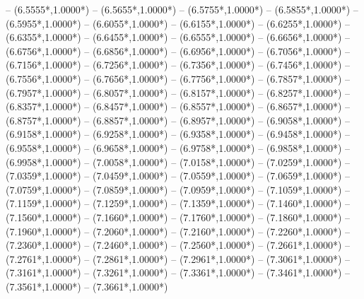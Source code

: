 {	-- ({6.5555*\dx},{1.0000*\dy})
	-- ({6.5655*\dx},{1.0000*\dy})
	-- ({6.5755*\dx},{1.0000*\dy})
	-- ({6.5855*\dx},{1.0000*\dy})
	-- ({6.5955*\dx},{1.0000*\dy})
	-- ({6.6055*\dx},{1.0000*\dy})
	-- ({6.6155*\dx},{1.0000*\dy})
	-- ({6.6255*\dx},{1.0000*\dy})
	-- ({6.6355*\dx},{1.0000*\dy})
	-- ({6.6455*\dx},{1.0000*\dy})
	-- ({6.6555*\dx},{1.0000*\dy})
	-- ({6.6656*\dx},{1.0000*\dy})
	-- ({6.6756*\dx},{1.0000*\dy})
	-- ({6.6856*\dx},{1.0000*\dy})
	-- ({6.6956*\dx},{1.0000*\dy})
	-- ({6.7056*\dx},{1.0000*\dy})
	-- ({6.7156*\dx},{1.0000*\dy})
	-- ({6.7256*\dx},{1.0000*\dy})
	-- ({6.7356*\dx},{1.0000*\dy})
	-- ({6.7456*\dx},{1.0000*\dy})
	-- ({6.7556*\dx},{1.0000*\dy})
	-- ({6.7656*\dx},{1.0000*\dy})
	-- ({6.7756*\dx},{1.0000*\dy})
	-- ({6.7857*\dx},{1.0000*\dy})
	-- ({6.7957*\dx},{1.0000*\dy})
	-- ({6.8057*\dx},{1.0000*\dy})
	-- ({6.8157*\dx},{1.0000*\dy})
	-- ({6.8257*\dx},{1.0000*\dy})
	-- ({6.8357*\dx},{1.0000*\dy})
	-- ({6.8457*\dx},{1.0000*\dy})
	-- ({6.8557*\dx},{1.0000*\dy})
	-- ({6.8657*\dx},{1.0000*\dy})
	-- ({6.8757*\dx},{1.0000*\dy})
	-- ({6.8857*\dx},{1.0000*\dy})
	-- ({6.8957*\dx},{1.0000*\dy})
	-- ({6.9058*\dx},{1.0000*\dy})
	-- ({6.9158*\dx},{1.0000*\dy})
	-- ({6.9258*\dx},{1.0000*\dy})
	-- ({6.9358*\dx},{1.0000*\dy})
	-- ({6.9458*\dx},{1.0000*\dy})
	-- ({6.9558*\dx},{1.0000*\dy})
	-- ({6.9658*\dx},{1.0000*\dy})
	-- ({6.9758*\dx},{1.0000*\dy})
	-- ({6.9858*\dx},{1.0000*\dy})
	-- ({6.9958*\dx},{1.0000*\dy})
	-- ({7.0058*\dx},{1.0000*\dy})
	-- ({7.0158*\dx},{1.0000*\dy})
	-- ({7.0259*\dx},{1.0000*\dy})
	-- ({7.0359*\dx},{1.0000*\dy})
	-- ({7.0459*\dx},{1.0000*\dy})
	-- ({7.0559*\dx},{1.0000*\dy})
	-- ({7.0659*\dx},{1.0000*\dy})
	-- ({7.0759*\dx},{1.0000*\dy})
	-- ({7.0859*\dx},{1.0000*\dy})
	-- ({7.0959*\dx},{1.0000*\dy})
	-- ({7.1059*\dx},{1.0000*\dy})
	-- ({7.1159*\dx},{1.0000*\dy})
	-- ({7.1259*\dx},{1.0000*\dy})
	-- ({7.1359*\dx},{1.0000*\dy})
	-- ({7.1460*\dx},{1.0000*\dy})
	-- ({7.1560*\dx},{1.0000*\dy})
	-- ({7.1660*\dx},{1.0000*\dy})
	-- ({7.1760*\dx},{1.0000*\dy})
	-- ({7.1860*\dx},{1.0000*\dy})
	-- ({7.1960*\dx},{1.0000*\dy})
	-- ({7.2060*\dx},{1.0000*\dy})
	-- ({7.2160*\dx},{1.0000*\dy})
	-- ({7.2260*\dx},{1.0000*\dy})
	-- ({7.2360*\dx},{1.0000*\dy})
	-- ({7.2460*\dx},{1.0000*\dy})
	-- ({7.2560*\dx},{1.0000*\dy})
	-- ({7.2661*\dx},{1.0000*\dy})
	-- ({7.2761*\dx},{1.0000*\dy})
	-- ({7.2861*\dx},{1.0000*\dy})
	-- ({7.2961*\dx},{1.0000*\dy})
	-- ({7.3061*\dx},{1.0000*\dy})
	-- ({7.3161*\dx},{1.0000*\dy})
	-- ({7.3261*\dx},{1.0000*\dy})
	-- ({7.3361*\dx},{1.0000*\dy})
	-- ({7.3461*\dx},{1.0000*\dy})
	-- ({7.3561*\dx},{1.0000*\dy})
	-- ({7.3661*\dx},{1.0000*\dy})
}
